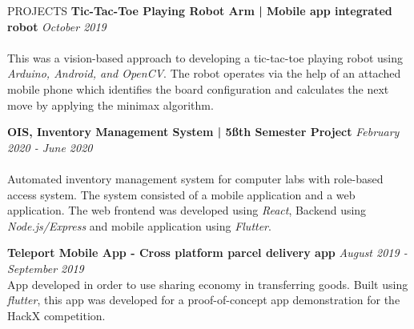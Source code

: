 \documentclass{cv}
\begin{document}
\begin{rSection}{PROJECTS}
    {\bf Tic-Tac-Toe Playing Robot Arm | Mobile app integrated robot}     \hfill {\em October 2019}
    \\ \\
    This was a vision-based approach to developing a tic-tac-toe playing robot using \textit{Arduino, Android, and OpenCV}.
    The robot operates via the help of an attached mobile phone which identifies the board configuration
    and calculates the next move by applying the minimax algorithm. \par\vspace{5pt}

    {\bf OIS, Inventory Management System | 5\ss{th} Semester Project}     \hfill {\em February 2020 - June 2020}
    \\ \\
    Automated inventory management system for computer labs with role-based access system.
    The system consisted of a mobile application and a web application.
    The web frontend was developed using \textit{React}, Backend using \textit{Node.js/Express} and
    mobile application using \textit{Flutter}.\par\vspace{5pt}

    {\bf Teleport Mobile App - Cross platform parcel delivery app}                        \hfill {\em August 2019 - September 2019}
    \\
    App developed in order to use sharing economy in transferring goods.
    Built using \textit{flutter}, this app was developed for a proof-of-concept app demonstration for the HackX competition. \par
\end{rSection}


\end{document}

